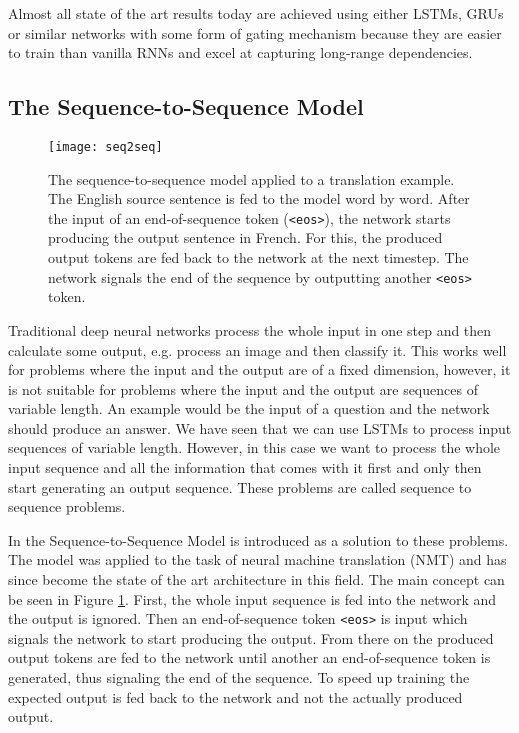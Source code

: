 Almost all state of the art results today are achieved using either LSTMs, GRUs or similar networks with some form of gating mechanism because they are easier to train than vanilla RNNs and excel at capturing long-range dependencies.

\subsection{The Sequence-to-Sequence Model}

\begin{figure}[t]
\centering
\texttt{[image: seq2seq]}
\caption{The sequence-to-sequence model applied to a translation example. The English source sentence is fed to the model word by word. After the input of an end-of-sequence token (\texttt{<eos>}), the network starts producing the output sentence in French. For this, the produced output tokens are fed back to the network at the next timestep. The network signals the end of the sequence by outputting another \texttt{<eos>} token.}
\label{seq2seq}
\end{figure}

Traditional deep neural networks process the whole input in one step and then calculate some output, e.g. process an image and then classify it. This works well for problems where the input and the output are of a fixed dimension, however, it is not suitable for problems where the input and the output are sequences of variable length. An example would be the input of a question and the network should produce an answer. We have seen that we can use LSTMs to process input sequences of variable length. However, in this case we want to process the whole input sequence and all the information that comes with it first and only then start generating an output sequence. These problems are called sequence to sequence problems.

In \cite{seq2seq} the Sequence-to-Sequence Model is introduced as a solution to these problems. The model was applied to the task of neural machine translation (NMT) and has since become the state of the art architecture in this field. The main concept can be seen in Figure \ref{seq2seq}. First, the whole input sequence is fed into the network and the output is ignored. Then an end-of-sequence token \texttt{<eos>} is input which signals the network to start producing the output. From there on the produced output tokens are fed to the network until another an end-of-sequence token is generated, thus signaling the end of the sequence. To speed up training the expected output is fed back to the network and not the actually produced output.

